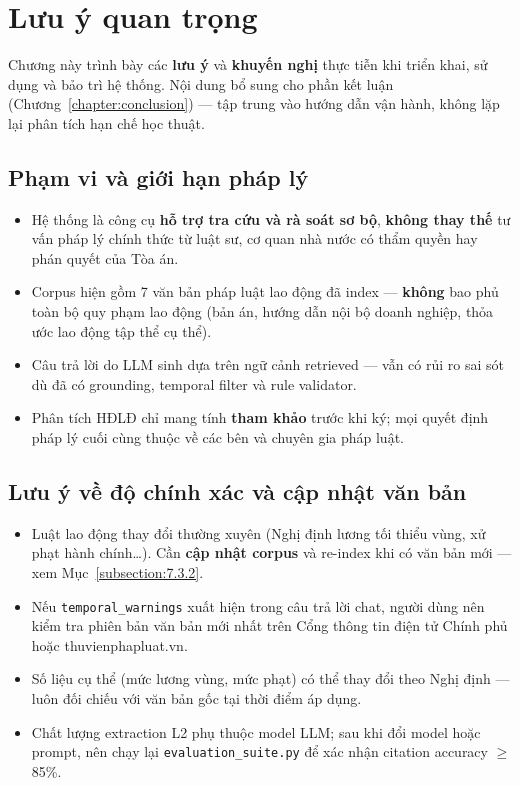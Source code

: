 \documentclass[../DoAn.tex]{subfiles}
\begin{document}
\section{Lưu ý quan trọng}
\label{section:7.1}

Chương này trình bày các \textbf{lưu ý} và \textbf{khuyến nghị} thực tiễn khi triển khai, sử dụng và bảo trì hệ thống. Nội dung bổ sung cho phần kết luận (Chương~\ref{chapter:conclusion}) --- tập trung vào hướng dẫn vận hành, không lặp lại phân tích hạn chế học thuật.

\subsection{Phạm vi và giới hạn pháp lý}
\label{subsection:7.1.1}

\begin{itemize}[nosep, leftmargin=*]
    \item Hệ thống là công cụ \textbf{hỗ trợ tra cứu và rà soát sơ bộ}, \textbf{không thay thế} tư vấn pháp lý chính thức từ luật sư, cơ quan nhà nước có thẩm quyền hay phán quyết của Tòa án.
    \item Corpus hiện gồm 7 văn bản pháp luật lao động đã index --- \textbf{không} bao phủ toàn bộ quy phạm lao động (bản án, hướng dẫn nội bộ doanh nghiệp, thỏa ước lao động tập thể cụ thể).
    \item Câu trả lời do \gls{LLM} sinh dựa trên ngữ cảnh retrieved --- vẫn có rủi ro sai sót dù đã có grounding, temporal filter và rule validator.
    \item Phân tích HĐLĐ chỉ mang tính \textbf{tham khảo} trước khi ký; mọi quyết định pháp lý cuối cùng thuộc về các bên và chuyên gia pháp luật.
\end{itemize}

\subsection{Lưu ý về độ chính xác và cập nhật văn bản}
\label{subsection:7.1.2}

\begin{itemize}[nosep, leftmargin=*]
    \item Luật lao động thay đổi thường xuyên (Nghị định lương tối thiểu vùng, xử phạt hành chính\ldots). Cần \textbf{cập nhật corpus} và re-index khi có văn bản mới --- xem Mục~\ref{subsection:7.3.2}.
    \item Nếu \texttt{temporal\_warnings} xuất hiện trong câu trả lời chat, người dùng nên kiểm tra phiên bản văn bản mới nhất trên Cổng thông tin điện tử Chính phủ hoặc thuvienphapluat.vn.
    \item Số liệu cụ thể (mức lương vùng, mức phạt) có thể thay đổi theo Nghị định --- luôn đối chiếu với văn bản gốc tại thời điểm áp dụng.
    \item Chất lượng extraction L2 phụ thuộc model LLM; sau khi đổi model hoặc prompt, nên chạy lại \texttt{evaluation\_suite.py} để xác nhận citation accuracy $\geq$ 85\%.
\end{itemize}
\end{document}
